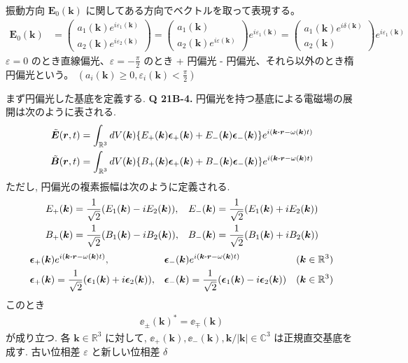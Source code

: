 \documentclass[uplatex,dvipdfmx,a4paper,11pt]{jlreq}
\newcommand{\CC}{\mathbb{C}}
\newcommand{\RR}{\mathbb{R}}
\newcommand{\EE}{\bm{E}}
\newcommand{\BB}{\bm{B}}
\newcommand{\rr}{\bm{r}}
\newcommand{\kk}{\bm{k}}
\theoremstyle{definition}
\begin{document}
\begin{definition}[偏光]
  振動方向 $\EE_0(\kk)$ に関してある方向でベクトルを取って表現する。
  \begin{align}
    \EE_0(\kk) & = \begin{pmatrix}
                     a_1(\kk)e^{i\varepsilon_1(\kk)} \\
                     a_2(\kk)e^{i\varepsilon_2(\kk)}
                   \end{pmatrix}
    =
    \begin{pmatrix}
      a_1(\kk) \\
      a_2(\kk)e^{i\varepsilon(\kk)}
    \end{pmatrix}e^{i\varepsilon_1(\kk)}
    =
    \begin{pmatrix}
      a_1(\kk)e^{i\delta(\kk)} \\
      a_2(\kk)
    \end{pmatrix}e^{i\varepsilon_1(\kk)}
  \end{align}
  $\varepsilon = 0$ のとき直線偏光、$\varepsilon = -\frac{\pi}{2}$ のとき + 円偏光 - 円偏光、それら以外のとき楕円偏光という。
  $(a_i(\kk) \geq 0, \varepsilon_i(\kk) < \frac{\pi}{2})$

  まず円偏光した基底を定義する.
  \textbf{Q 21B-4.} 円偏光を持つ基底による電磁場の展開は次のように表される.
  \begin{align}
    \tilde{\EE}(\rr, t) & = \int_{\RR^3} dV(\kk)\qty{E_+(\kk)\ee_+(\kk) + E_-(\kk)\ee_-(\kk)}e^{\ii(\kk\vdot\rr - \omega(\kk)t)} \\
    \tilde{\BB}(\rr, t) & = \int_{\RR^3} dV(\kk)\qty{B_+(\kk)\ee_+(\kk) + B_-(\kk)\ee_-(\kk)}e^{\ii(\kk\vdot\rr - \omega(\kk)t)}
  \end{align}
  ただし, 円偏光の複素振幅は次のように定義される.
  \begin{align}
    E_+(\kk) & = \frac{1}{\sqrt{2}}\qty(E_1(\kk) - \ii E_2(\kk)), & E_-(\kk) & = \frac{1}{\sqrt{2}}\qty(E_1(\kk) + \ii E_2(\kk)) \\
    B_+(\kk) & = \frac{1}{\sqrt{2}}\qty(B_1(\kk) - \ii B_2(\kk)), & B_-(\kk) & = \frac{1}{\sqrt{2}}\qty(B_1(\kk) + \ii B_2(\kk))
  \end{align}
  \begin{align}
    \ee_+(\kk) & e^{\ii(\kk\vdot\rr - \omega(\kk)t)},              & \ee_-(\kk) & e^{\ii(\kk\vdot\rr - \omega(\kk)t)}              & (\kk\in\RR^3) \\
    \ee_+(\kk) & = \frac{1}{\sqrt{2}}(\ee_1(\kk) + \ii\ee_2(\kk)), & \ee_-(\kk) & = \frac{1}{\sqrt{2}}(\ee_1(\kk) - \ii\ee_2(\kk)) & (\kk\in\RR^3)
  \end{align}
  このとき
  \begin{align}
    \ee_\pm(\kk)^* = \ee_\mp(\kk)
  \end{align}
  が成り立つ.
  各 $\kk\in\RR^3$ に対して, $\ee_+(\kk), \ee_-(\kk), \kk/|\kk|\in\CC^3$ は正規直交基底を成す.
  古い位相差 $\varepsilon$ と新しい位相差 $\delta$
\end{definition}
\end{document}
